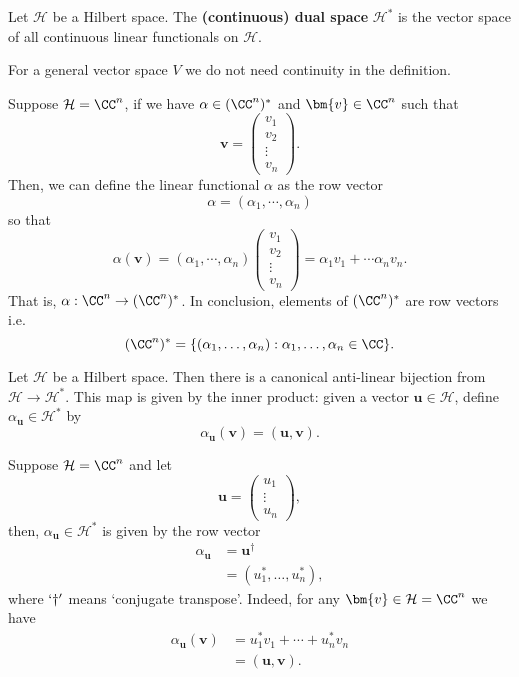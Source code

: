 \documentclass[12pt, a4paper]{article}
\begin{document}
\begin{definition}
    Let \(\mathcal{H}\) be a Hilbert space. The \textbf{(continuous) dual space} \(\mathcal{H}^*\) is the vector space of all continuous linear functionals on \(\mathcal{H}\).
\end{definition}

\begin{mdremark}
    For a general vector space \(V\) we do not need continuity in the definition.
\end{mdremark}

\begin{mdexample}
    Suppose \(\mathcal{H} = \CC^n\), if we have \(\alpha \in (\CC^n)^*\) and \(\bm{v} \in \CC^n\) such that
    \[\bm{v} = \begin{pmatrix} v_1 \\ v_2 \\ \vdots \\ v_n \end{pmatrix}.\]
    Then, we can define the linear functional \(\alpha\) as the row vector
    \[\alpha = (\alpha_1, \cdots, \alpha_n)\]
    so that 
    \[\alpha(\bm{v}) = (\alpha_1, \cdots, \alpha_n)\begin{pmatrix} v_1 \\ v_2 \\ \vdots \\ v_n \end{pmatrix} = \alpha_1 v_1 + \cdots \alpha_n v_n.\]
    That is, \(\alpha: \CC^n \to (\CC^n)^*\). In conclusion, elements of \((\CC^n)^*\) are row vectors i.e. 
    \[(\CC^n)^* = \{(\alpha_1, \ldots , \alpha_n) : \alpha_1,\ldots,\alpha_n \in \CC\}.\]
\end{mdexample}

\begin{mdthm}
    Let \(\mathcal{H}\) be a Hilbert space. Then there is a canonical anti-linear bijection from \(\mathcal{H} \to \mathcal{H}^*\). This map is given by the inner product: given a vector \(\bm{u} \in \mathcal{H}\), define \(\alpha_{\bm{u}} \in \mathcal{H}^*\) by 
    \[\alpha_{\bm{u}}(\bm{v}) = (\bm{u},\bm{v}).\]
\end{mdthm}

\begin{mdexample}
    Suppose \(\mathcal{H} = \CC^n\) and let 
    \[\bm{u} = \begin{pmatrix} u_1 \\ \vdots \\ u_n \end{pmatrix},\]
    then, \(\alpha_{\bm{u}} \in \mathcal{H}^*\) is given by the row vector
    \[\begin{aligned}
        \alpha_{\bm{u}} &= \bm{u}^{\dagger} \\
        &= (u_1^*, \ldots, u_n^*),
    \end{aligned}\]
    where \(`\dagger'\) means `conjugate transpose'.
    Indeed, for any \(\bm{v} \in \mathcal{H} = \CC^n\) we have
    \[\begin{aligned}
        \alpha_{\bm{u}}(\bm{v}) &= u_1^* v_1 + \cdots + u_n^*v_n \\
        &= (\bm{u},\bm{v}).
    \end{aligned}\]
\end{mdexample}
\end{document}
